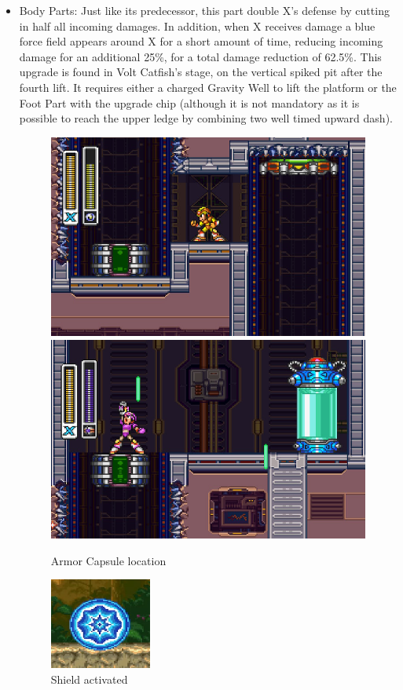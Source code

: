 \begin{itemize}
	\item Body Parts: Just like its predecessor, this part double X's defense by cutting in half all incoming damages. In addition, when X receives damage a blue force field appears around X for a short amount of time, reducing incoming damage for an additional 25\%, for a total damage reduction of 62.5\%. This upgrade is found in Volt Catfish's stage, on the vertical spiked pit after the fourth lift. It requires either a charged Gravity Well to lift the platform or the Foot Part with the upgrade chip (although it is not mandatory as it is possible to reach the upper ledge by combining two well timed upward dash).
	\begin{figure}[htp]
		\centering
		\includegraphics[width=.45\linewidth]{figures/X3/Volt_catfish/Armor_1.png}
		\includegraphics[width=.45\linewidth]{figures/X3/Volt_catfish/Armor_2.png}
		\caption{Armor Capsule location}
	\end{figure}
	
	\begin{figure}[htp]
		\centering
		\includegraphics[height=3cm]{figures/X3/weapons/Armor_shield.png}
		\caption{Shield activated}
	\end{figure}
	

\end{itemize}
